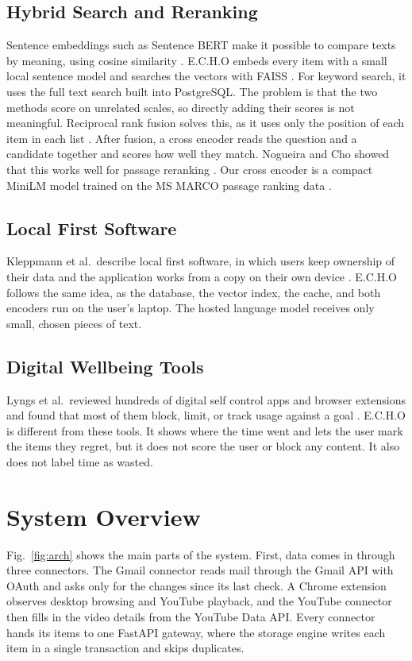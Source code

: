 \documentclass[conference]{IEEEtran}
\begin{document}
\subsection{Hybrid Search and Reranking}
Sentence embeddings such as Sentence BERT make it possible to compare texts by meaning, using cosine similarity \cite{b6}. E.C.H.O embeds every item with a small local sentence model and searches the vectors with FAISS \cite{b8}. For keyword search, it uses the full text search built into PostgreSQL. The problem is that the two methods score on unrelated scales, so directly adding their scores is not meaningful. Reciprocal rank fusion solves this, as it uses only the position of each item in each list \cite{b9}. After fusion, a cross encoder reads the question and a candidate together and scores how well they match. Nogueira and Cho showed that this works well for passage reranking \cite{b10}. Our cross encoder is a compact MiniLM \cite{b7} model trained on the MS MARCO passage ranking data \cite{b11}.

\subsection{Local First Software}
Kleppmann et al.\ describe local first software, in which users keep ownership of their data and the application works from a copy on their own device \cite{b12}. E.C.H.O follows the same idea, as the database, the vector index, the cache, and both encoders run on the user's laptop. The hosted language model receives only small, chosen pieces of text.

\subsection{Digital Wellbeing Tools}
Lyngs et al.\ reviewed hundreds of digital self control apps and browser extensions and found that most of them block, limit, or track usage against a goal \cite{b14}. E.C.H.O is different from these tools. It shows where the time went and lets the user mark the items they regret, but it does not score the user or block any content. It also does not label time as wasted.

\section{System Overview}\label{sec:overview}
Fig.~\ref{fig:arch} shows the main parts of the system. First, data comes in through three connectors. The Gmail connector reads mail through the Gmail API with OAuth and asks only for the changes since its last check. A Chrome extension observes desktop browsing and YouTube playback, and the YouTube connector then fills in the video details from the YouTube Data API. Every connector hands its items to one FastAPI gateway, where the storage engine writes each item in a single transaction and skips duplicates.
\end{document}
